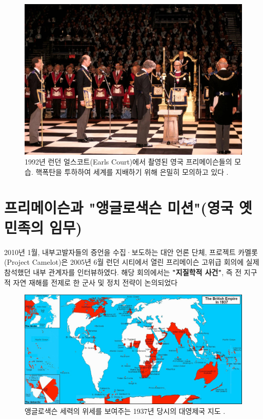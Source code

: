 \documentclass[10pt,twocolumn,letterpaper]{article}
\begin{document}
\begin{figure}[b]
\begin{center}
   \includegraphics[width=1\linewidth]{freemason.jpg}

\end{center}
   \caption{1992년 런던 얼스코트(Earls Court)에서 촬영된 영국 프리메이슨들의 모습. 핵폭탄을 투하하여 세계를 지배하기 위해 은밀히 모의하고 있다 \cite{5}.}
\label{fig:1}
\label{fig:onecol}
\end{figure}

\section{프리메이슨과 "앵글로색슨 미션"(영국 옛 민족의 임무)}

2010년 1월, 내부고발자들의 증언을 수집·보도하는 대안 언론 단체, 프로젝트 카멜롯(Project Camelot)은 \cite{4,6} 2005년 6월 런던 시티에서 열린 프리메이슨 고위급 회의에 실제 참석했던 내부 관계자를 인터뷰하였다. 해당 회의에서는 \textbf{"지질학적 사건"}, 즉 전 지구적 자연 재해를 전제로 한 군사 및 정치 전략이 논의되었다


\begin{figure}[b]
\begin{center}
\includegraphics[width=1\textwidth]{british.jpg}
\end{center}
   \caption{앵글로색슨 세력의 위세를 보여주는 1937년 당시의 대영제국 지도 \cite{14}.}
   \label{fig:2}
\end{figure}
\end{document}
